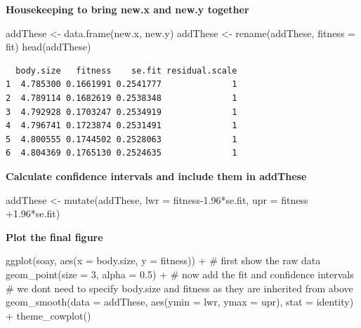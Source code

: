 \documentclass[
  letterpaper,
  DIV=11,
  numbers=noendperiod]{scrreprt}
\newenvironment{Shaded}{\begin{snugshade}}{\end{snugshade}}
\newcommand{\AttributeTok}[1]{\textcolor[rgb]{0.40,0.45,0.13}{#1}}
\newcommand{\CommentTok}[1]{\textcolor[rgb]{0.37,0.37,0.37}{#1}}
\newcommand{\DecValTok}[1]{\textcolor[rgb]{0.68,0.00,0.00}{#1}}
\newcommand{\FloatTok}[1]{\textcolor[rgb]{0.68,0.00,0.00}{#1}}
\newcommand{\FunctionTok}[1]{\textcolor[rgb]{0.28,0.35,0.67}{#1}}
\newcommand{\NormalTok}[1]{\textcolor[rgb]{0.00,0.23,0.31}{#1}}
\newcommand{\OtherTok}[1]{\textcolor[rgb]{0.00,0.23,0.31}{#1}}
\newcommand{\SpecialCharTok}[1]{\textcolor[rgb]{0.37,0.37,0.37}{#1}}
\newcommand{\StringTok}[1]{\textcolor[rgb]{0.13,0.47,0.30}{#1}}
\begin{document}
\textbf{Housekeeping to bring new.x and new.y together}

\begin{Shaded}
\begin{Highlighting}[]
\NormalTok{addThese }\OtherTok{\textless{}{-}} \FunctionTok{data.frame}\NormalTok{(new.x, new.y)}
\NormalTok{addThese }\OtherTok{\textless{}{-}} \FunctionTok{rename}\NormalTok{(addThese, }\AttributeTok{fitness =}\NormalTok{ fit)}
\FunctionTok{head}\NormalTok{(addThese)}
\end{Highlighting}
\end{Shaded}

\begin{verbatim}
  body.size   fitness    se.fit residual.scale
1  4.785300 0.1661991 0.2541777              1
2  4.789114 0.1682619 0.2538348              1
3  4.792928 0.1703247 0.2534919              1
4  4.796741 0.1723874 0.2531491              1
5  4.800555 0.1744502 0.2528063              1
6  4.804369 0.1765130 0.2524635              1
\end{verbatim}

\textbf{Calculate confidence intervals and include them in addThese}

\begin{Shaded}
\begin{Highlighting}[]
\NormalTok{addThese }\OtherTok{\textless{}{-}} \FunctionTok{mutate}\NormalTok{(addThese, }
 \AttributeTok{lwr =}\NormalTok{ fitness}\FloatTok{{-}1.96}\SpecialCharTok{*}\NormalTok{se.fit, }
 \AttributeTok{upr =}\NormalTok{ fitness }\SpecialCharTok{+}\FloatTok{1.96}\SpecialCharTok{*}\NormalTok{se.fit)}
\end{Highlighting}
\end{Shaded}

\textbf{Plot the final figure}

\begin{Shaded}
\begin{Highlighting}[]
\FunctionTok{ggplot}\NormalTok{(soay, }\FunctionTok{aes}\NormalTok{(}\AttributeTok{x =}\NormalTok{ body.size, }\AttributeTok{y =}\NormalTok{ fitness)) }\SpecialCharTok{+}
 \CommentTok{\# first show the raw data}
 \FunctionTok{geom\_point}\NormalTok{(}\AttributeTok{size =} \DecValTok{3}\NormalTok{, }\AttributeTok{alpha =} \FloatTok{0.5}\NormalTok{) }\SpecialCharTok{+}
 \CommentTok{\# now add the fit and confidence intervals}
 \CommentTok{\# we don\textquotesingle{}t need to specify body.size and fitness as they are inherited from above}
 \FunctionTok{geom\_smooth}\NormalTok{(}\AttributeTok{data =}\NormalTok{ addThese, }\FunctionTok{aes}\NormalTok{(}\AttributeTok{ymin =}\NormalTok{ lwr, }\AttributeTok{ymax =}\NormalTok{ upr), }\AttributeTok{stat =} \StringTok{\textquotesingle{}identity\textquotesingle{}}\NormalTok{) }\SpecialCharTok{+}
 \FunctionTok{theme\_cowplot}\NormalTok{()}
\end{Highlighting}
\end{Shaded}
\end{document}
